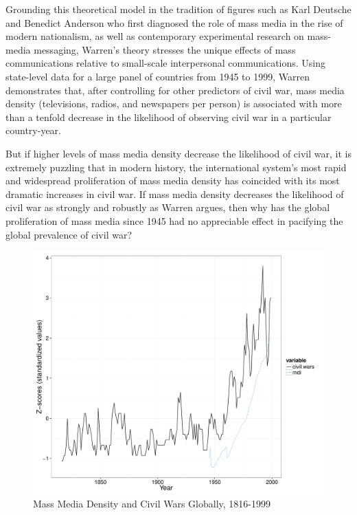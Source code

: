 \documentclass[11pt,article,oneside]{memoir}
\makeatletter
\def\maxwidth{\ifdim\Gin@nat@width>\linewidth\linewidth
\else\Gin@nat@width\fi}
\let\Oldincludegraphics\includegraphics
\renewcommand{\includegraphics}[1]{\Oldincludegraphics[width=\maxwidth]{#1}}
\makeatother
\begin{document}
Grounding this theoretical model in the tradition of figures such as
Karl Deutsche and Benedict Anderson who first diagnosed the role of mass
media in the rise of modern nationalism, as well as contemporary
experimental research on mass-media messaging, Warren's theory stresses
the unique effects of mass communications relative to small-scale
interpersonal communications. Using state-level data for a large panel
of countries from 1945 to 1999, Warren demonstrates that, after
controlling for other predictors of civil war, mass media density
(televisions, radios, and newspapers per person) is associated with more
than a tenfold decrease in the likelihood of observing civil war in a
particular country-year.

But if higher levels of mass media density decrease the likelihood of
civil war, it is extremely puzzling that in modern history, the
international system's most rapid and widespread proliferation of mass
media density has coincided with its most dramatic increases in civil
war. If mass media density decreases the likelihood of civil war as
strongly and robustly as Warren argues, then why has the global
proliferation of mass media since 1945 had no appreciable effect in
pacifying the global prevalence of civil war?

\begin{figure}[htbp]
\centering
\includegraphics{figure/globalplot.pdf}
\caption{Mass Media Density and Civil Wars Globally, 1816-1999}
\end{figure}
\end{document}
